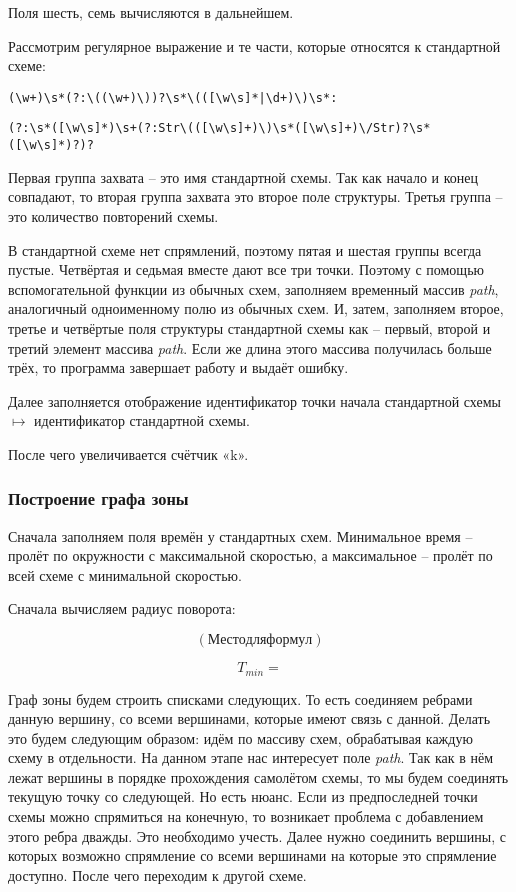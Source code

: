 \documentclass[12pt, a4 paper]{article}
\theoremstyle{plain}
\begin{document}
Поля шесть, семь вычисляются в дальнейшем.

Рассмотрим регулярное выражение и те части, которые относятся к стандартной схеме:

\begin{verbatim}
(\w+)\s*(?:\((\w+)\))?\s*\(([\w\s]*|\d+)\)\s*:
\end{verbatim}

\begin{verbatim}
(?:\s*([\w\s]*)\s+(?:Str\(([\w\s]+)\)\s*([\w\s]+)\/Str)?\s*([\w\s]*)?)?
\end{verbatim}

Первая группа захвата – это имя стандартной схемы. Так как начало и конец совпадают, то вторая группа захвата это второе поле структуры. Третья группа – это количество повторений схемы.

В стандартной схеме нет спрямлений, поэтому пятая и шестая группы всегда пустые. Четвёртая и седьмая вместе дают все три точки. Поэтому с помощью вспомогательной функции из обычных схем, заполняем временный массив \textit{path}, аналогичный одноименному полю из обычных схем. И, затем, заполняем второе, третье и четвёртые поля структуры стандартной схемы как – первый, второй и третий элемент массива \textit{path}. Если же длина этого массива получилась больше трёх, то программа завершает работу и выдаёт ошибку.

Далее заполняется отображение идентификатор точки начала стандартной схемы $\mapsto$ идентификатор стандартной схемы.

После чего увеличивается счётчик «k».



\subsubsection*{Построение графа зоны}

Сначала заполняем поля времён у стандартных схем. Минимальное время – пролёт по окружности с максимальной скоростью, а максимальное – пролёт по всей схеме с минимальной скоростью.

Сначала вычисляем радиус поворота:

$$
 (Место для формул)
$$

$$
T_{min} = 
$$

Граф зоны будем строить списками следующих. То есть соединяем ребрами данную вершину, со всеми вершинами, которые имеют связь с данной. Делать это будем следующим образом: идём по массиву схем, обрабатывая каждую схему в отдельности. На данном этапе нас интересует поле \textit{path}. Так как в нём лежат вершины в порядке прохождения самолётом схемы, то мы будем соединять текущую точку со следующей. Но есть нюанс. Если из предпоследней точки схемы можно спрямиться на конечную, то возникает проблема с добавлением этого ребра дважды. Это необходимо учесть. Далее нужно соединить вершины, с которых возможно спрямление со всеми вершинами на которые это спрямление доступно. После чего переходим к другой схеме.
\end{document}
